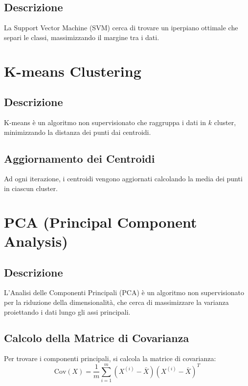 \documentclass[a4paper,12pt]{report}
\begin{document}
\section{Descrizione}
La Support Vector Machine (SVM) cerca di trovare un iperpiano ottimale che separi le classi, massimizzando il margine tra i dati.

\chapter{K-means Clustering}
\section{Descrizione}
K-means è un algoritmo non supervisionato che raggruppa i dati in \( k \) cluster, minimizzando la distanza dei punti dai centroidi.

\section{Aggiornamento dei Centroidi}
Ad ogni iterazione, i centroidi vengono aggiornati calcolando la media dei punti in ciascun cluster.

\chapter{PCA (Principal Component Analysis)}
\section{Descrizione}
L'Analisi delle Componenti Principali (PCA) è un algoritmo non supervisionato per la riduzione della dimensionalità, che cerca di massimizzare la varianza proiettando i dati lungo gli assi principali.

\section{Calcolo della Matrice di Covarianza}
Per trovare i componenti principali, si calcola la matrice di covarianza:
\[
\text{Cov}(X) = \frac{1}{m} \sum_{i=1}^{m} (X^{(i)} - \bar{X})(X^{(i)} - \bar{X})^T
\]
\end{document}
